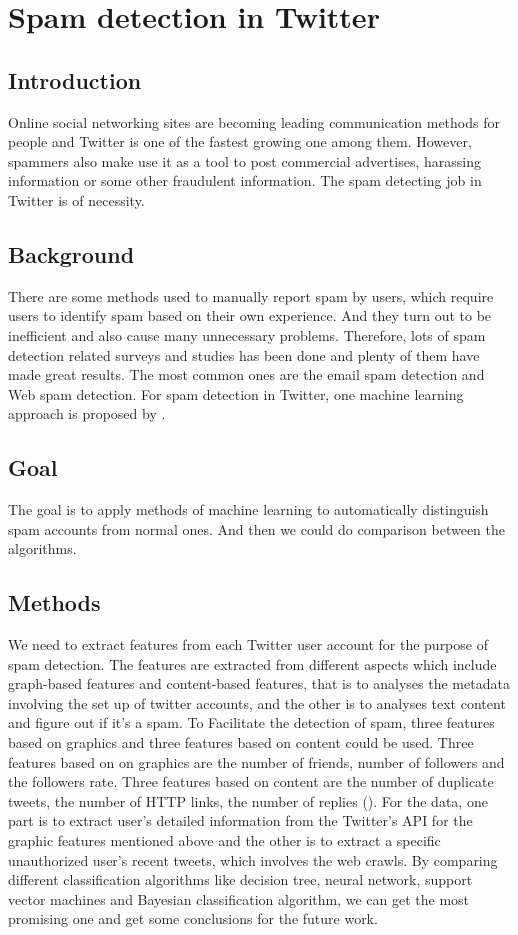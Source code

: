 \documentclass[../proposal.tex]{subfiles}
\begin{document}
\section{Spam detection in Twitter}

\subsection{Introduction}
Online social networking sites are becoming leading communication methods for
people and Twitter is one of the fastest growing one among them. However, 
spammers also make use it as a tool to post commercial advertises,
harassing information or some other fraudulent information. The spam detecting
job in Twitter is of necessity.

\subsection{Background}
There are some methods used to manually report spam by users, which require
users to identify spam based on their own experience. And they turn out to be
inefficient and also cause many unnecessary problems. Therefore, lots of spam
detection related surveys and studies has been done and plenty of them have
made great results. The most common ones are the email spam detection and Web
spam detection. For spam detection in Twitter, one machine learning approach is
proposed by \cite{wang2010don}.

\subsection{Goal}
The goal is to apply methods of machine learning to automatically distinguish
spam accounts from normal ones. And then we could do comparison between the
algorithms.

\subsection{Methods}
We need to extract features from each Twitter user account for the purpose of
spam detection. The features are extracted from different aspects which include
graph-based features and content-based features, that is to analyses the
metadata involving the set up of twitter accounts, and the other is to analyses
text content and figure out if it’s a spam. To Facilitate the detection of
spam,  three features based on graphics and three features based on content
could be used. Three features based on on graphics are the number of friends,
number of followers and the followers rate. Three features based on content are
the number of duplicate tweets, the number of HTTP links, the number of
replies (\cite{wang2010don}). For the data, one part is to extract user's
detailed information from the Twitter's API for the graphic features mentioned
above and the other is to extract a specific unauthorized user's recent tweets,
which involves the web crawls. By comparing different classification algorithms
like decision tree, neural network, support vector machines and Bayesian
classification algorithm, we can get the most promising one and get some
conclusions for the future work.
\end{document}
